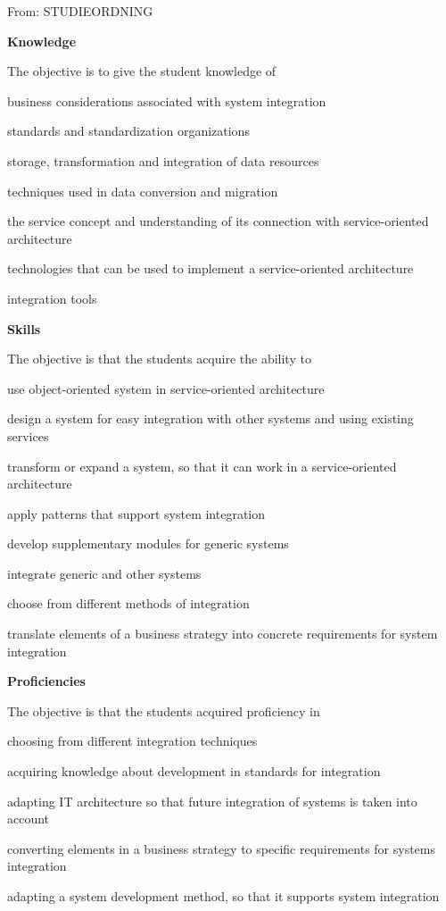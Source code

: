 \documentclass[Screen16to9,17pt]{foils}
\begin{document}

From: STUDIEORDNING

{\bf Knowledge}

The objective is to give the student knowledge of

\begin{list2}
\item business considerations associated with system integration
\item standards and standardization organizations
\item storage, transformation and integration of data resources
\item techniques used in data conversion and migration
\item the service concept and understanding of its connection with service-oriented architecture
\item technologies that can be used to implement a service-oriented architecture
\item integration tools
\end{list2}


{\bf Skills}

The objective is that the students acquire the ability to

\begin{list2}
\item use object-oriented system in service-oriented architecture
\item design a system for easy integration with other systems and using existing services
\item transform or expand a system, so that it can work in a service-oriented architecture
\item apply patterns that support system integration
\item develop supplementary modules for generic systems
\item integrate generic and other systems
\item choose from different methods of integration
\item translate elements of a business strategy into concrete requirements for system integration
\end{list2}


{\bf Proficiencies}

The objective is that the students acquired proficiency in

\begin{list2}
\item choosing from different integration techniques
\item acquiring knowledge about development in standards for integration
\item adapting IT architecture so that future integration of systems is taken into account
\item converting elements in a business strategy to specific requirements for systems integration
\item adapting a system development method, so that it supports system integration
\end{list2}
\end{document}
